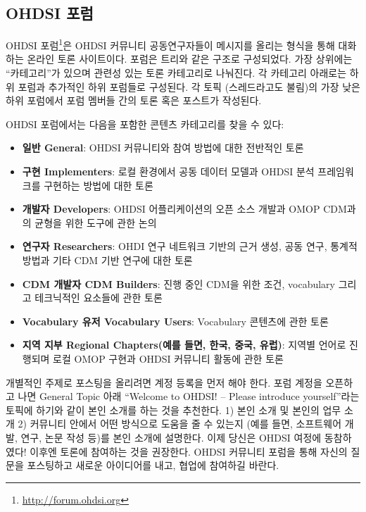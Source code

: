 \documentclass[11pt]{book}
\providecommand{\tightlist}{%
  \setlength{\itemsep}{0pt}\setlength{\parskip}{0pt}}
\let\rmarkdownfootnote\footnote%
\def\footnote{\protect\rmarkdownfootnote}
\theoremstyle{definition}
\theoremstyle{definition}
\theoremstyle{definition}
\theoremstyle{remark}
\begin{document}
\hypertarget{ohdsi-}{\subsection{OHDSI 포럼}\label{ohdsi-}}

OHDSI 포럼\footnote{\url{http://forum.ohdsi.org}}은 OHDSI 커뮤니티
공동연구자들이 메시지를 올리는 형식을 통해 대화하는 온라인 토론
사이트이다. 포럼은 트리와 같은 구조로 구성되었다. 가장 상위에는
``카테고리''가 있으며 관련성 있는 토론 카테고리로 나눠진다. 각 카테고리
아래로는 하위 포럼과 추가적인 하위 포럼들로 구성된다. 각 토픽
(스레드라고도 불림)의 가장 낮은 하위 포럼에서 포럼 멤버들 간의 토론 혹은
포스트가 작성된다.

OHDSI 포럼에서는 다음을 포함한 콘텐츠 카테고리를 찾을 수 있다:

\begin{itemize}
\tightlist
\item
  \textbf{일반 General}: OHDSI 커뮤니티와 참여 방법에 대한 전반적인 토론
\item
  \textbf{구현 Implementers}: 로컬 환경에서 공동 데이터 모델과 OHDSI
  분석 프레임워크를 구현하는 방법에 대한 토론
\item
  \textbf{개발자 Developers}: OHDSI 어플리케이션의 오픈 소스 개발과 OMOP
  CDM과의 균형을 위한 도구에 관한 논의
\item
  \textbf{연구자 Researchers}: OHDI 연구 네트워크 기반의 근거 생성, 공동
  연구, 통계적 방법과 기타 CDM 기반 연구에 대한 토론
\item
  \textbf{CDM 개발자 CDM Builders}: 진행 중인 CDM을 위한 조건,
  vocabulary 그리고 테크닉적인 요소들에 관한 토론
\item
  \textbf{Vocabulary 유저 Vocabulary Users}: Vocabulary 콘텐츠에 관한
  토론
\item
  \textbf{지역 지부 Regional Chapters(예를 들면, 한국, 중국, 유럽)}:
  지역별 언어로 진행되며 로컬 OMOP 구현과 OHDSI 커뮤니티 활동에 관한
  토론
\end{itemize}

개별적인 주제로 포스팅을 올리려면 계정 등록을 먼저 해야 한다. 포럼
계정을 오픈하고 나면 General Topic 아래 ``Welcome to OHDSI! -- Please
introduce yourself''라는 토픽에 하기와 같이 본인 소개를 하는 것을
추천한다. 1) 본인 소개 및 본인의 업무 소개 2) 커뮤니티 안에서 어떤
방식으로 도움을 줄 수 있는지 (예를 들면, 소프트웨어 개발, 연구, 논문
작성 등)를 본인 소개에 설명한다. 이제 당신은 OHDSI 여정에 동참하였다!
이후엔 토론에 참여하는 것을 권장한다. OHDSI 커뮤니티 포럼을 통해 자신의
질문을 포스팅하고 새로운 아이디어를 내고, 협업에 참여하길 바란다.
\end{document}
